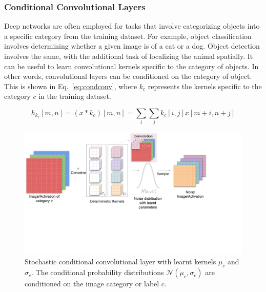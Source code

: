 \documentclass[12pt, letterpaper]{article}
\begin{document}
\subsubsection{Conditional Convolutional Layers}
\label{sec:condconv}
Deep networks are often employed for tasks that involve categorizing objects into a specific category from the training dataset. For example, object classification involves determining whether a given image is of a cat or a dog. Object detection involves the same, with the additional task of localizing the animal spatially. It can be useful to learn convolutional kernels specific to the category of objects. In other words, convolutional layers can be conditioned on the category of object. This is shown in Eq.~\eqref{eq:condconv}, where $k_c$ represents the kernels specific to the category $c$ in the training dataset.

\begin{equation}
  h_{k_c}[m,n]=(x * k_c)[m,n]=\sum_i \sum_j k_c[i,j]x[m+i,n+j]
  \label{eq:condconv}
\end{equation}
\begin{figure}[t]
    \centering
    \includegraphics[width=\textwidth, trim={0 5cm 2.5cm 0}, clip]{Conditional noise layer.pdf}
    \caption{Stochastic conditional convolutional layer with learnt kernels $\mu_c$ and $\sigma_c$. The conditional probability distributions $\mathcal{N}(\mu_c, \sigma_c)$ are conditioned on the image category or label $c$.}
    \label{fig:condconv}
\end{figure}
\end{document}
